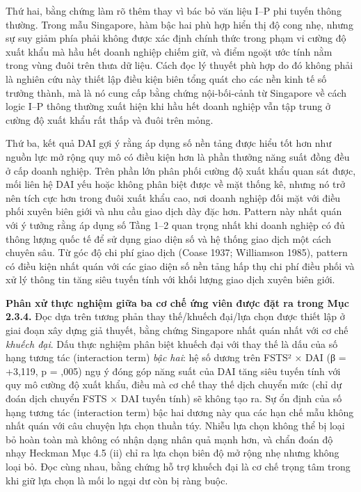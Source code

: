 \documentclass[12pt,a4paper]{article}
\begin{document}
Thứ hai, bằng chứng làm rõ thêm thay vì bác bỏ văn liệu I--P phi tuyến
thông thường. Trong mẫu Singapore, hàm bậc hai phù hợp hiển thị độ cong
nhẹ, nhưng sự suy giảm phía phải không được xác định chính thức trong
phạm vi cường độ xuất khẩu mà hầu hết doanh nghiệp chiếm giữ, và điểm
ngoặt ước tính nằm trong vùng đuôi trên thưa dữ liệu. Cách đọc lý thuyết
phù hợp do đó không phải là nghiên cứu này thiết lập điều kiện biên tổng
quát cho các nền kinh tế số trưởng thành, mà là nó cung cấp bằng chứng
nội-bối-cảnh từ Singapore về cách logic I--P thông thường xuất hiện khi
hầu hết doanh nghiệp vẫn tập trung ở cường độ xuất khẩu rất thấp và đuôi
trên mỏng.

Thứ ba, kết quả DAI gợi ý rằng áp dụng số nền tảng được hiểu tốt hơn như
nguồn lực mở rộng quy mô có điều kiện hơn là phần thưởng năng suất đồng
đều ở cấp doanh nghiệp. Trên phần lớn phân phối cường độ xuất khẩu quan
sát được, mối liên hệ DAI yếu hoặc không phân biệt được về mặt thống kê,
nhưng nó trở nên tích cực hơn trong đuôi xuất khẩu cao, nơi doanh nghiệp
đối mặt với điều phối xuyên biên giới và nhu cầu giao dịch dày đặc hơn.
Pattern này nhất quán với ý tưởng rằng áp dụng số Tầng 1--2 quan trọng
nhất khi doanh nghiệp có đủ thông lượng quốc tế để sử dụng giao diện số
và hệ thống giao dịch một cách chuyên sâu. Từ góc độ chi phí giao dịch
(Coase 1937; Williamson 1985), pattern có điều kiện nhất quán với các
giao diện số nền tảng hấp thụ chi phí điều phối và xử lý thông tin tăng
siêu tuyến tính với khối lượng giao dịch xuyên biên giới.

\textbf{Phân xử thực nghiệm giữa ba cơ chế ứng viên được đặt ra trong
Mục 2.3.4.} Đọc dựa trên tương phản thay thế/khuếch đại/lựa chọn được
thiết lập ở giai đoạn xây dựng giả thuyết, bằng chứng Singapore nhất
quán nhất với cơ chế \emph{khuếch đại}. Dấu thực nghiệm phân biệt khuếch
đại với thay thế là dấu của số hạng tương tác (interaction term)
\emph{bậc hai}: hệ số dương trên FSTS² × DAI (β = +3,119, p = ,005) ngụ
ý đóng góp năng suất của DAI tăng siêu tuyến tính với quy mô cường độ
xuất khẩu, điều mà cơ chế thay thế dịch chuyển mức (chỉ dự đoán dịch
chuyển FSTS × DAI tuyến tính) sẽ không tạo ra. Sự ổn định của số hạng
tương tác (interaction term) bậc hai dương này qua các hạn chế mẫu không
nhất quán với câu chuyện lựa chọn thuần túy. Nhiễu lựa chọn không thể bị
loại bỏ hoàn toàn mà không có nhận dạng nhân quả mạnh hơn, và chẩn đoán
độ nhạy Heckman Mục 4.5 (ii) chỉ ra lựa chọn biên độ mở rộng nhẹ nhưng
không loại bỏ. Đọc cùng nhau, bằng chứng hỗ trợ khuếch đại là cơ chế
trọng tâm trong khi giữ lựa chọn là mối lo ngại dư còn bị ràng buộc.
\end{document}
